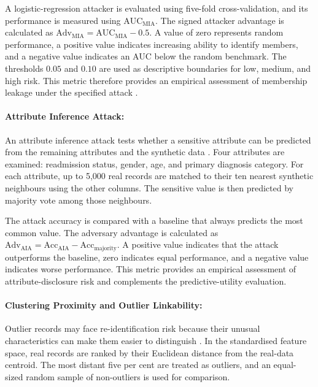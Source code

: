 A logistic-regression attacker is evaluated using five-fold
cross-validation, and its performance is measured using
$\mathrm{AUC}_{\mathrm{MIA}}$. The signed attacker advantage is
calculated as
$\mathrm{Adv}_{\mathrm{MIA}}
= \mathrm{AUC}_{\mathrm{MIA}}-0.5$.
A value of zero represents random performance, a positive value
indicates increasing ability to identify members, and a negative value
indicates an AUC below the random benchmark. The thresholds $0.05$ and
$0.10$ are used as descriptive boundaries for low, medium, and high
risk. This metric therefore provides an empirical assessment of
membership leakage under the specified attack
\cite{Murtaza2023,hernandez2022synthetic}.

\paragraph{Attribute Inference Attack:}
\label{sec:eval:privacy:aia}

An attribute inference attack tests whether a sensitive attribute can
be predicted from the remaining attributes and the synthetic data
\cite{Murtaza2023}. Four attributes are examined: readmission status,
gender, age, and primary diagnosis category. For each attribute, up to
5,000 real records are matched to their ten nearest synthetic
neighbours using the other columns. The sensitive value is then
predicted by majority vote among those neighbours.

The attack accuracy is compared with a baseline that always predicts
the most common value. The adversary advantage is calculated as
$\mathrm{Adv}_{\mathrm{AIA}}
= \mathrm{Acc}_{\mathrm{AIA}}
- \mathrm{Acc}_{\mathrm{majority}}$.
A positive value indicates that the attack outperforms the baseline,
zero indicates equal performance, and a negative value indicates worse
performance. This metric provides an empirical assessment of
attribute-disclosure risk and complements the predictive-utility
evaluation.

\paragraph{Clustering Proximity and Outlier Linkability:}
\label{sec:eval:privacy:linkability}

Outlier records may face re-identification risk because their
unusual characteristics can make them easier to distinguish
\cite{stadler2022synthetic,wang2019generating}. In the standardised
feature space, real records are ranked by their Euclidean distance from
the real-data centroid. The most distant five per cent are treated as
outliers, and an equal-sized random sample of non-outliers is used for
comparison.

